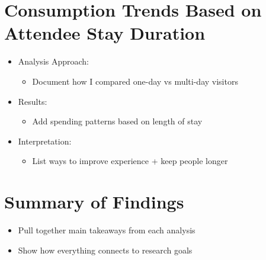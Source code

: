 \section{Consumption Trends Based on Attendee Stay Duration}
\label{sec:data-analysis-consumption-trends}
\begin{itemize}
    \item Analysis Approach:
    \begin{itemize}
        \item Document how I compared one-day vs multi-day visitors
    \end{itemize}

    \item Results:
    \begin{itemize}
        \item Add spending patterns based on length of stay
    \end{itemize}

    \item Interpretation:
    \begin{itemize}
        \item List ways to improve experience + keep people longer
    \end{itemize}
\end{itemize}


\section{Summary of Findings}
\label{sec:data-analysis-summary}
\begin{itemize}
    \item Pull together main takeaways from each analysis
    \item Show how everything connects to research goals
\end{itemize}